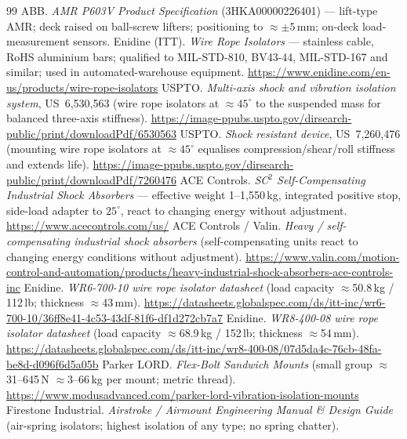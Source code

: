 \documentclass[11pt,a4paper]{article}
\begin{document}
\begin{thebibliography}{99}
\small
{} ABB. \textit{AMR P603V Product Specification} (3HKA00000226401) --- lift-type AMR; deck
raised on ball-screw lifters; positioning to $\approx\pm5$\,mm; on-deck load-measurement sensors.
 Enidine (ITT). \textit{Wire Rope Isolators} --- stainless cable, RoHS aluminium bars;
qualified to MIL-STD-810, BV43-44, MIL-STD-167 and similar; used in automated-warehouse equipment.
\url{https://www.enidine.com/en-us/products/wire-rope-isolators}
 USPTO. \textit{Multi-axis shock and vibration isolation system}, US~6,530,563
(wire rope isolators at $\approx 45^{\circ}$ to the suspended mass for balanced three-axis stiffness).
\url{https://image-ppubs.uspto.gov/dirsearch-public/print/downloadPdf/6530563}
 USPTO. \textit{Shock resistant device}, US~7,260,476 (mounting wire rope isolators at
$\approx 45^{\circ}$ equalises compression/shear/roll stiffness and extends life).
\url{https://image-ppubs.uspto.gov/dirsearch-public/print/downloadPdf/7260476}
 ACE Controls. \textit{SC$^2$ Self-Compensating Industrial Shock Absorbers} --- effective
weight 1--1{,}550\,kg, integrated positive stop, side-load adapter to $25^{\circ}$, react to changing
energy without adjustment. \url{https://www.acecontrols.com/us/}
 ACE Controls / Valin. \textit{Heavy / self-compensating industrial shock absorbers}
(self-compensating units react to changing energy conditions without adjustment).
\url{https://www.valin.com/motion-control-and-automation/products/heavy-industrial-shock-absorbers-ace-controls-inc}
 Enidine. \textit{WR6-700-10 wire rope isolator datasheet} (load capacity $\approx$50.8\,kg
/ 112\,lb; thickness $\approx$43\,mm).
\url{https://datasheets.globalspec.com/ds/itt-inc/wr6-700-10/36ff8e41-4c53-43df-81f6-df1d272cb7a7}
 Enidine. \textit{WR8-400-08 wire rope isolator datasheet} (load capacity $\approx$68.9\,kg
/ 152\,lb; thickness $\approx$54\,mm).
\url{https://datasheets.globalspec.com/ds/itt-inc/wr8-400-08/07d5da4c-76cb-48fa-be8d-d096f6d5a05b}
 Parker LORD. \textit{Flex-Bolt Sandwich Mounts} (small group $\approx$31--645\,N
$\approx$3--66\,kg per mount; metric thread).
\url{https://www.modusadvanced.com/parker-lord-vibration-isolation-mounts}
 Firestone Industrial. \textit{Airstroke / Airmount Engineering Manual \& Design Guide}
(air-spring isolators; highest isolation of any type; no spring chatter).

\end{thebibliography}
\end{document}
